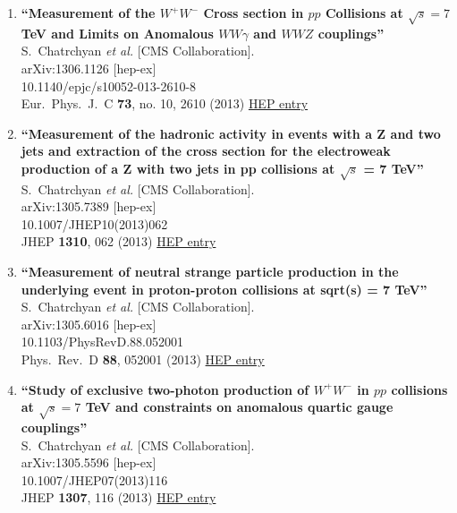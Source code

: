 \documentclass{article}
\begin{document}
\begin{enumerate}
\item%
{\bf ``Measurement of the $W^+W^-$ Cross section in $pp$ Collisions at $\sqrt{s} = 7$ TeV and Limits on Anomalous $WW\gamma$ and $WWZ$ couplings''}
  \\{}S.~Chatrchyan {\it et al.} [CMS Collaboration].
  \\{}arXiv:1306.1126 [hep-ex]
    \\{}10.1140/epjc/s10052-013-2610-8
\\{}Eur.\ Phys.\ J.\ C {\bf 73}, no. 10, 2610 (2013) %
\href{http://inspirehep.net/record/1237104}{HEP entry}


\item%
{\bf ``Measurement of the hadronic activity in events with a Z and two jets and extraction of the cross section for the electroweak production of a Z with two jets in pp collisions at $\sqrt{s}$ = 7 TeV''}
  \\{}S.~Chatrchyan {\it et al.} [CMS Collaboration].
  \\{}arXiv:1305.7389 [hep-ex]
    \\{}10.1007/JHEP10(2013)062
\\{}JHEP {\bf 1310}, 062 (2013) %
\href{http://inspirehep.net/record/1236361}{HEP entry}


\item%
{\bf ``Measurement of neutral strange particle production in the underlying event in proton-proton collisions at sqrt(s) = 7 TeV''}
  \\{}S.~Chatrchyan {\it et al.} [CMS Collaboration].
  \\{}arXiv:1305.6016 [hep-ex]
    \\{}10.1103/PhysRevD.88.052001
\\{}Phys.\ Rev.\ D {\bf 88}, 052001 (2013) %
\href{http://inspirehep.net/record/1235536}{HEP entry}


\item%
{\bf ``Study of exclusive two-photon production of $W^+W^-$ in $pp$ collisions at $\sqrt{s} = 7$ TeV and constraints on anomalous quartic gauge couplings''}
  \\{}S.~Chatrchyan {\it et al.} [CMS Collaboration].
  \\{}arXiv:1305.5596 [hep-ex]
    \\{}10.1007/JHEP07(2013)116
\\{}JHEP {\bf 1307}, 116 (2013) %
\href{http://inspirehep.net/record/1235421}{HEP entry}



\end{enumerate}
\end{document}
